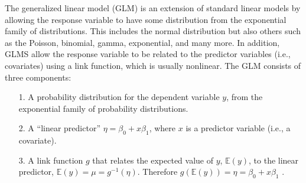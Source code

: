 The generalized linear model (GLM) is an extension of standard linear
models by allowing the response
variable to have some distribution from the exponential family of
distributions. This includes the normal
distribution but also others such as the Poisson, binomial,
gamma, exponential, and many more. In addition, GLMS allow the
response variable to be related to the predictor variables (i.e.,
covariates) using a link function, which is usually nonlinear.  
The GLM consists of three components:
\begin{itemize}
\item[1.] A probability distribution for the dependent variable $y$,
from the exponential family of probability distributions.
\item[2.] A ``linear predictor'' $\eta = \beta_0 + x \beta_1$, where
  $x$ is a predictor variable (i.e., a covariate).
\item[3.] A link function $g$ that relates the expected value of $y$, $\mathbb{E}(y)$, to the linear predictor, $\mathbb{E}(y) = \mu = g^{-1}(\eta)$. Therefore $g(\mathbb{E}(y)) = \eta = \beta_0 + x \beta_1$ .
\end{itemize}
